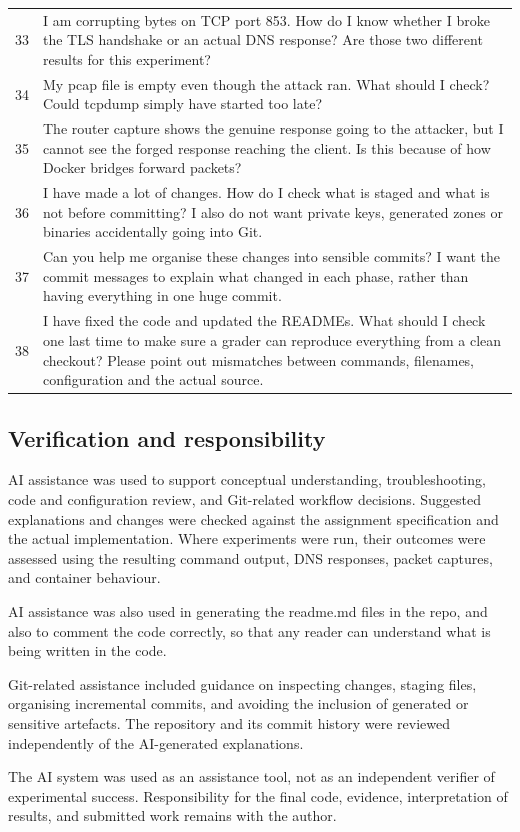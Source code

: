 \documentclass[11pt]{article}
\begin{document}
\begin{longtable}{p{0.8cm}p{12.0cm}}
    33 &
    I am corrupting bytes on TCP port 853. How do I know whether I
    broke the TLS handshake or an actual DNS response? Are those two
    different results for this experiment?\\

    34 &
    My pcap file is empty even though the attack ran. What should I
    check? Could tcpdump simply have started too late?\\

    35 &
    The router capture shows the genuine response going to the attacker,
    but I cannot see the forged response reaching the client. Is this
    because of how Docker bridges forward packets?\\

    36 &
    I have made a lot of changes. How do I check what is staged and
    what is not before committing? I also do not want private keys,
    generated zones or binaries accidentally going into Git.\\

    37 &
    Can you help me organise these changes into sensible commits?
    I want the commit messages to explain what changed in each phase,
    rather than having everything in one huge commit.\\

    38 &
    I have fixed the code and updated the READMEs. What should I check
    one last time to make sure a grader can reproduce everything from
    a clean checkout? Please point out mismatches between commands,
    filenames, configuration and the actual source.\\

\end{longtable}

\subsection{Verification and responsibility}

AI assistance was used to support conceptual understanding,
troubleshooting, code and configuration review, and Git-related
workflow decisions. Suggested explanations and changes were checked
against the assignment specification and the actual implementation.
Where experiments were run, their outcomes were assessed using the
resulting command output, DNS responses, packet captures, and container
behaviour.

AI assistance was also used in generating the readme.md files in the repo, and also to comment the code correctly, so that any reader can understand what is being written in the code.

Git-related assistance included guidance on inspecting changes, staging
files, organising incremental commits, and avoiding the inclusion of
generated or sensitive artefacts. The repository and its commit history
were reviewed independently of the AI-generated explanations.

The AI system was used as an assistance tool, not as an independent
verifier of experimental success. Responsibility for the final code,
evidence, interpretation of results, and submitted work remains with
the author.
\end{document}
